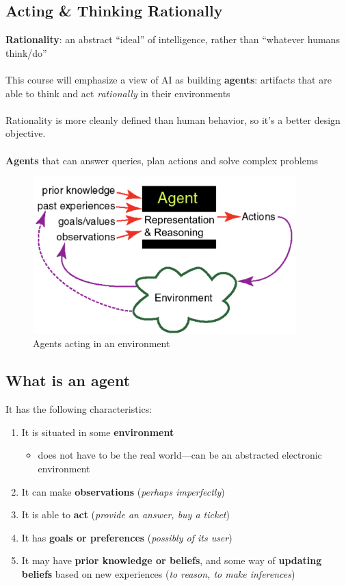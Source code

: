 \documentclass{article}
\begin{document}
\subsection*{Acting \& Thinking Rationally}
{\bf Rationality}: an abstract “ideal” of intelligence, rather than “whatever humans think/do” \\ \\
This course will emphasize a view of AI as building {\bf agents}: artifacts that are able to think and act {\it rationally} in their environments \\ \\
Rationality is more cleanly defined than human behavior, so it's a better design objective. \\\\
{\bf Agents} that can answer queries, plan actions and solve complex problems
\begin{figure}[H]
	\centering
	\includegraphics[width=4in]{Pic1}
	\caption{Agents acting in an environment}
\end{figure}

\subsection*{What is an agent}
It has the following characteristics:
\begin{enumerate}
	\item It is situated in some {\bf environment}
	\begin{itemize}
		\item does not have to be the real world---can be an abstracted electronic environment
	\end{itemize}
	\item It can make {\bf observations} ({\it perhaps imperfectly})
	\item It is able to {\bf act} ({\it provide an answer, buy a ticket})
	\item It has {\bf goals or preferences} ({\it possibly of its user})
	\item It may have {\bf prior knowledge or beliefs}, and some way of {\bf updating beliefs} based on new experiences ({\it to reason, to make inferences})
\end{enumerate}
\end{document}
